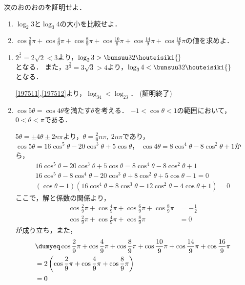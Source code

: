\begin{problem}
  次のおのおのを証明せよ．
\begin{enumerate}
\item  $\log_2 3$と$\log_3 4$の大小を比較せよ．
\item $\displaystyle\cos\frac{2}{9}\pi+\cos\frac{4}{9}\pi+\cos\frac{8}{9}\pi+
\cos\frac{10}{9}\pi+\cos\frac{14}{9}\pi+\cos\frac{16}{9}\pi$の値を求めよ．
\end{enumerate}
\end{problem}

\begin{enumerate}
  \item $2^{\frac23} = 2\sqrt2 < 3$より，$\log_23 > \bunsuu32 \houteisiki{\label{197511}}$\\ となる．
  また，$3^{\frac23} = 3\sqrt3 > 4$より，$\log_34 < \bunsuu32 \houteisiki{\label{197512}}$\\となる．

  \eqref{197511},\eqref{197512}より，$\log_34 < \log_23$．
  \hfill
  (証明終了)

  \item
  $\cos5\theta = \cos4\theta$を満たす$\theta$を考える．
  $-1 < \cos\theta < 1$の範囲において，$0 < \theta < \pi$である．

  $5\theta = \pm 4\theta\pm 2n\pi$より，$ \theta = \frac29n\pi,\ 2n\pi$であり，
  $\cos5\theta = 16\cos^5\theta - 20\cos^3\theta + 5\cos\theta$，
  $\cos4\theta = 8\cos^4\theta - 8\cos^2\theta + 1$から，
  \begin{align*}
    16\cos^5\theta - 20\cos^3\theta + 5\cos\theta = 8\cos^4\theta - 8\cos^2\theta + 1\\
    16\cos^5\theta - 8\cos^4\theta -20\cos^3\theta + 8\cos^2\theta + 5\cos\theta -1 = 0 \\
    (\cos\theta -1)(16\cos^4\theta + 8\cos^3\theta-12\cos^2\theta-4\cos\theta +1) = 0
  \end{align*}
  ここで，解と係数の関係より，
  \begin{align*}
    \cos\frac29\pi + \cos\frac49\pi + \cos\frac69\pi +\cos\frac89\pi &= -\frac12\\
    \cos\frac29\pi + \cos\frac49\pi +\cos\frac89\pi &= 0
  \end{align*}
  が成り立ち，また，
  \begin{align*}
    &\dumyeq\cos\frac29\pi + \cos\frac49\pi +\cos\frac89\pi + \cos\frac{10}{9}\pi + \cos\frac{14}{9}\pi + \cos\frac{16}9\pi\\
    &=2\left(\cos\frac29\pi + \cos\frac49\pi +\cos\frac89\pi\right) \\
    &= 0
  \end{align*}

\end{enumerate}
